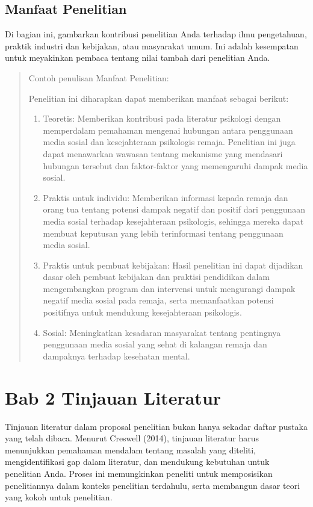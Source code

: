 \documentclass[
  indonesian,
  letterpaper,
]{scrbook}
\providecommand{\tightlist}{%
  \setlength{\itemsep}{0pt}\setlength{\parskip}{0pt}}
\begin{document}
\subsection{Manfaat Penelitian}\label{manfaat-penelitian}

Di bagian ini, gambarkan kontribusi penelitian Anda terhadap ilmu
pengetahuan, praktik industri dan kebijakan, atau masyarakat umum. Ini
adalah kesempatan untuk meyakinkan pembaca tentang nilai tambah dari
penelitian Anda.

\begin{quote}
Contoh penulisan Manfaat Penelitian:

Penelitian ini diharapkan dapat memberikan manfaat sebagai berikut:

\begin{enumerate}
\def\labelenumi{\arabic{enumi}.}
\tightlist
\item
  Teoretis: Memberikan kontribusi pada literatur psikologi dengan
  memperdalam pemahaman mengenai hubungan antara penggunaan media sosial
  dan kesejahteraan psikologis remaja. Penelitian ini juga dapat
  menawarkan wawasan tentang mekanisme yang mendasari hubungan tersebut
  dan faktor-faktor yang memengaruhi dampak media sosial.
\item
  Praktis untuk individu: Memberikan informasi kepada remaja dan orang
  tua tentang potensi dampak negatif dan positif dari penggunaan media
  sosial terhadap kesejahteraan psikologis, sehingga mereka dapat
  membuat keputusan yang lebih terinformasi tentang penggunaan media
  sosial.
\item
  Praktis untuk pembuat kebijakan: Hasil penelitian ini dapat dijadikan
  dasar oleh pembuat kebijakan dan praktisi pendidikan dalam
  mengembangkan program dan intervensi untuk mengurangi dampak negatif
  media sosial pada remaja, serta memanfaatkan potensi positifnya untuk
  mendukung kesejahteraan psikologis.
\item
  Sosial: Meningkatkan kesadaran masyarakat tentang pentingnya
  penggunaan media sosial yang sehat di kalangan remaja dan dampaknya
  terhadap kesehatan mental.
\end{enumerate}
\end{quote}

\section{Bab 2 Tinjauan Literatur}\label{bab-2-tinjauan-literatur}

Tinjauan literatur dalam proposal penelitian bukan hanya sekadar daftar
pustaka yang telah dibaca. Menurut Creswell (2014), tinjauan literatur
harus menunjukkan pemahaman mendalam tentang masalah yang diteliti,
mengidentifikasi gap dalam literatur, dan mendukung kebutuhan untuk
penelitian Anda. Proses ini memungkinkan peneliti untuk memposisikan
penelitiannya dalam konteks penelitian terdahulu, serta membangun dasar
teori yang kokoh untuk penelitian.
\end{document}
